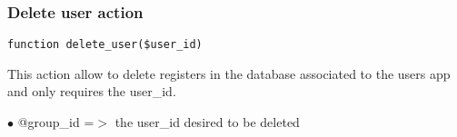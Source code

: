 \documentclass[a4paper]{article}
\begin{document}
\hypertarget{toc176}{}
\subsubsection{Delete user action}

\begin{lstlisting}
function delete_user($user_id)
\end{lstlisting}

This action allow to delete registers in the database associated to
the users app and only requires the user\_id.

\begin{compactitem}
\item[\color{myblue}$\bullet$] @group\_id =$>$ the user\_id desired to be deleted
\end{compactitem}

\end{document}
